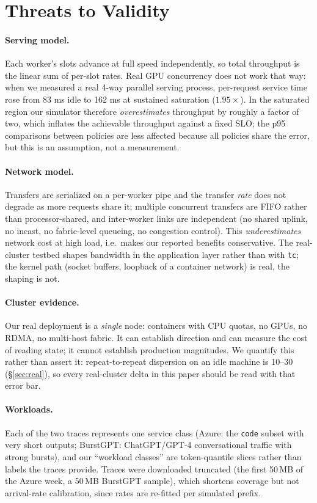 \section{Threats to Validity}
\label{sec:threats}

\paragraph{Serving model.} Each worker's slots advance at full speed independently, so total
throughput is the linear sum of per-slot rates. Real GPU concurrency does not work that way: when
we measured a real 4-way parallel serving process, per-request service time rose from
83 ms idle to 162 ms at sustained saturation ($1.95\times$).
In the saturated region our simulator therefore \emph{overestimates} throughput by roughly a
factor of two, which inflates the achievable throughput against a fixed SLO; the p95 comparisons
between policies are less affected because all policies share the error, but this is an
assumption, not a measurement.

\paragraph{Network model.} Transfers are serialized on a per-worker pipe and the transfer
\emph{rate} does not degrade as more requests share it; multiple concurrent transfers are FIFO
rather than processor-shared, and inter-worker links are independent (no shared uplink, no
incast, no fabric-level queueing, no congestion control). This \emph{underestimates} network cost
at high load, i.e.~makes our reported benefits conservative. The real-cluster testbed shapes
bandwidth in the application layer rather than with \texttt{tc}; the kernel path (socket buffers,
loopback of a container network) is real, the shaping is not.

\paragraph{Cluster evidence.} Our real deployment is a \emph{single} node: containers with CPU
quotas, no GPUs, no RDMA, no multi-host fabric. It can establish direction and can measure the
cost of reading state; it cannot establish production magnitudes. We quantify this rather than
assert it: repeat-to-repeat dispersion on an idle machine is 10--30 %
(\S\ref{sec:real}), so every real-cluster delta in this paper should be read with that error bar.

\paragraph{Workloads.} Each of the two traces represents one service class (Azure: the
\texttt{code} subset with very short outputs; BurstGPT: ChatGPT/GPT-4 conversational traffic with
strong bursts), and our ``workload classes'' are token-quantile slices rather than labels the
traces provide. Traces were downloaded truncated (the first 50\,MB of the Azure week, a 50\,MB
BurstGPT sample), which shortens coverage but not arrival-rate calibration, since rates are
re-fitted per simulated prefix.

